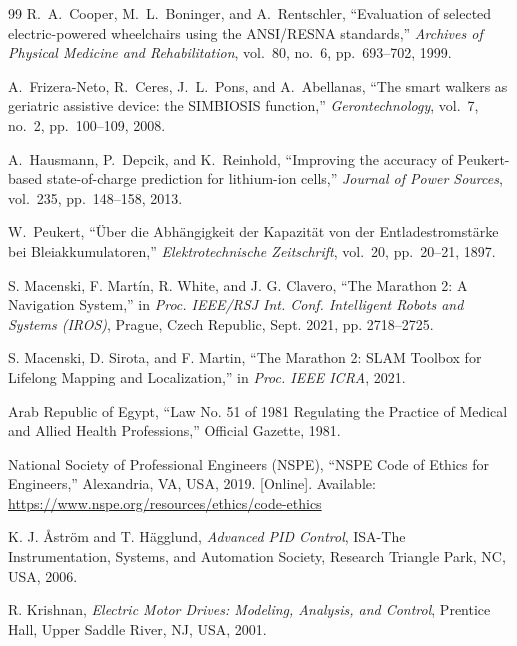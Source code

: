 \documentclass[12pt,a4paper]{report}
\begin{document}
\begin{singlespace}
\begin{thebibliography}{99}
R.~A.~Cooper, M.~L.~Boninger, and A.~Rentschler,
``Evaluation of selected electric-powered wheelchairs using the ANSI/RESNA
  standards,''
\textit{Archives of Physical Medicine and Rehabilitation},
vol.~80, no.~6, pp.~693--702, 1999.

A.~Frizera-Neto, R.~Ceres, J.~L.~Pons, and A.~Abellanas,
``The smart walkers as geriatric assistive device: the SIMBIOSIS function,''
\textit{Gerontechnology}, vol.~7, no.~2, pp.~100--109, 2008.

A.~Hausmann, P.~Depcik, and K.~Reinhold,
``Improving the accuracy of Peukert-based state-of-charge prediction for
  lithium-ion cells,''
\textit{Journal of Power Sources}, vol.~235, pp.~148--158, 2013.

W.~Peukert,
``{\"U}ber die Abh{\"a}ngigkeit der Kapazit{\"a}t von der Entladestromst{\"a}rke
bei Bleiakkumulatoren,''
\textit{Elektrotechnische Zeitschrift}, vol.~20, pp.~20--21, 1897.





S. Macenski, F. Mart{\'i}n, R. White, and J. G. Clavero, ``The Marathon 2: A Navigation System,'' in \textit{Proc. IEEE/RSJ Int. Conf. Intelligent Robots and Systems (IROS)}, Prague, Czech Republic, Sept. 2021, pp. 2718--2725.

S. Macenski, D. Sirota, and F. Martin, ``The Marathon 2: SLAM Toolbox for Lifelong Mapping and Localization,'' in \textit{Proc. IEEE ICRA}, 2021.



Arab Republic of Egypt, ``Law No. 51 of 1981 Regulating the Practice of Medical and Allied Health Professions,'' Official Gazette, 1981.



National Society of Professional Engineers (NSPE), ``NSPE Code of Ethics for Engineers,'' Alexandria, VA, USA, 2019. [Online]. Available: \url{https://www.nspe.org/resources/ethics/code-ethics}

K. J. \r{A}str{\"o}m and T. H{\"a}gglund, \textit{Advanced PID Control}, ISA-The Instrumentation, Systems, and Automation Society, Research Triangle Park, NC, USA, 2006.

R. Krishnan, \textit{Electric Motor Drives: Modeling, Analysis, and Control}, Prentice Hall, Upper Saddle River, NJ, USA, 2001.


\end{thebibliography}
\end{singlespace}
\end{document}
